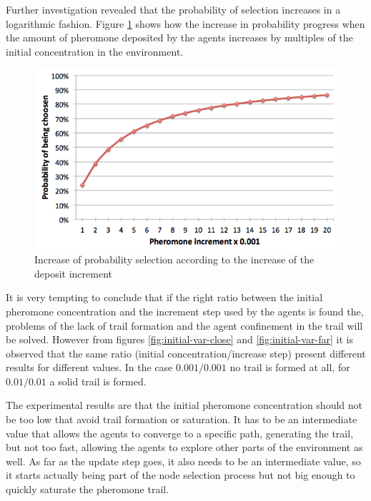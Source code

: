 Further investigation revealed that the probability of selection increases in a logarithmic fashion. Figure \ref{fig:prob-inc} shows how the increase in probability progress when the amount of pheromone deposited by the agents increases by multiples of the initial concentration in the environment.

\begin{figure}[H]
  \centering
  \includegraphics[width=0.6\linewidth]{gfx/probability-increase.png}
  \caption[Selection probability increasing]{Increase of probability selection according to the increase of the deposit increment}
  \label{fig:prob-inc}
\end{figure}

It is very tempting to conclude that if the right ratio between the initial pheromone concentration and the increment step used by the agents is found the, problems of the lack of trail formation and the agent confinement in the trail will be solved. However from figures \ref{fig:initial-var-close} and \ref{fig:initial-var-far} it is observed that the same ratio (initial concentration/increase step) present different results for different values. In the case $0.001/0.001$ no trail is formed at all, for $0.01/0.01$ a solid trail is formed. 

The experimental results are that the initial pheromone concentration should not be too low that avoid trail formation or saturation. It has to be an intermediate value that allows the agents to converge to a specific path, generating the trail, but not too fast, allowing the agents to explore other parts of the environment as well. As far as the update step goes, it also needs to be an intermediate value, so it starts actually being part of the node selection process but not big enough to quickly saturate the pheromone trail.

